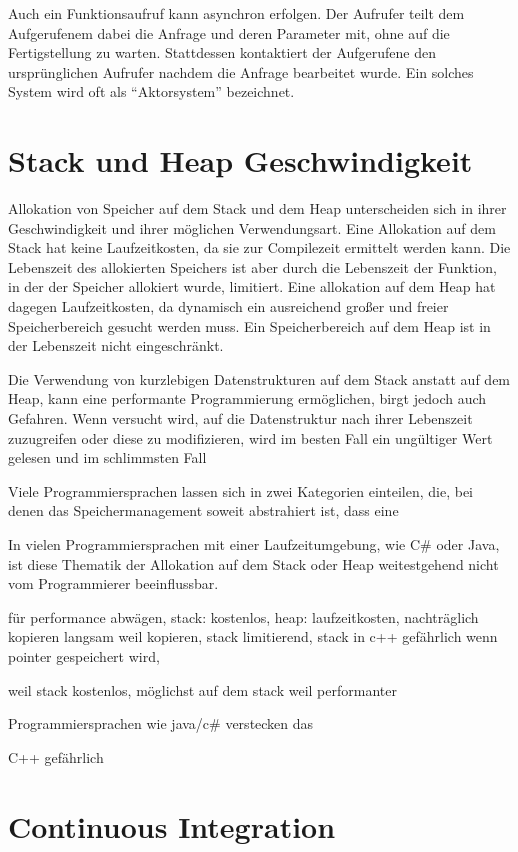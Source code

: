 Auch ein Funktionsaufruf kann asynchron erfolgen.
Der Aufrufer teilt dem Aufgerufenem dabei die Anfrage und deren Parameter mit, ohne auf die Fertigstellung zu warten.
Stattdessen kontaktiert der Aufgerufene den ursprünglichen Aufrufer nachdem die Anfrage bearbeitet wurde.
Ein solches System wird oft als \enquote{Aktorsystem} bezeichnet.

\section{Stack und Heap Geschwindigkeit}


Allokation von Speicher auf dem Stack und dem Heap unterscheiden sich in ihrer Geschwindigkeit und ihrer möglichen Verwendungsart.
Eine Allokation auf dem Stack hat keine Laufzeitkosten, da sie zur Compilezeit ermittelt werden kann.
Die Lebenszeit des allokierten Speichers ist aber durch die Lebenszeit der Funktion, in der der Speicher allokiert wurde, limitiert.
Eine allokation auf dem Heap hat dagegen Laufzeitkosten, da dynamisch ein ausreichend großer und freier Speicherbereich gesucht werden muss.
Ein Speicherbereich auf dem Heap ist in der Lebenszeit nicht eingeschränkt.

Die Verwendung von kurzlebigen Datenstrukturen auf dem Stack anstatt auf dem Heap, kann eine performante Programmierung ermöglichen, birgt jedoch auch Gefahren.
Wenn versucht wird, auf die Datenstruktur nach ihrer Lebenszeit zuzugreifen oder diese zu modifizieren, wird im besten Fall ein ungültiger Wert gelesen und im schlimmsten Fall 

Viele Programmiersprachen lassen sich in zwei Kategorien einteilen, die, bei denen das Speichermanagement soweit abstrahiert ist, dass eine 

In vielen Programmiersprachen mit einer Laufzeitumgebung, wie C\# oder Java, ist diese Thematik der Allokation auf dem Stack oder Heap weitestgehend nicht vom Programmierer beeinflussbar.



für performance abwägen,
stack: kostenlos,
heap: laufzeitkosten,
nachträglich kopieren langsam weil kopieren,
stack limitierend,
stack in c++ gefährlich wenn pointer gespeichert wird,

weil stack kostenlos, möglichst auf dem stack weil performanter

Programmiersprachen wie java/c\# verstecken das

C++ gefährlich

\section{Continuous Integration}

